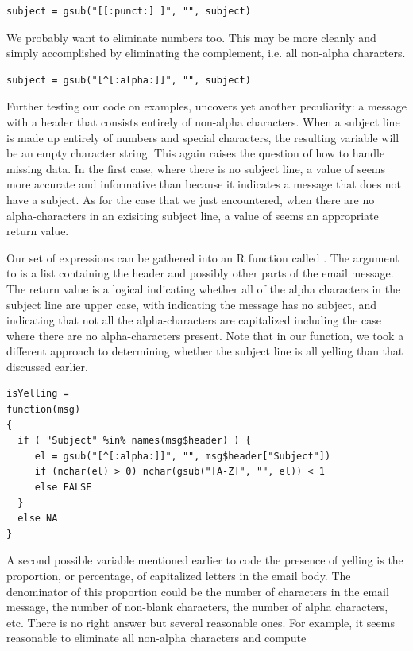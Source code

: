 \begin{verbatim}
subject = gsub("[[:punct:] ]", "", subject)
\end{verbatim}

We probably want to eliminate numbers too.
This may be more cleanly and simply accomplished by 
eliminating the complement, i.e. all non-alpha characters.

\begin{verbatim}
subject = gsub("[^[:alpha:]]", "", subject)
\end{verbatim}

Further testing our code on examples, uncovers yet another
peculiarity: a message with a header that consists entirely
of non-alpha characters. 
When a subject line is made up entirely of numbers and special
characters, the resulting variable 
will be an empty character string.
This again raises the question of how to handle missing data.
In the first case, where there is no subject line, 
a value of  seems more 
accurate and informative than  because 
it indicates a message that does not have a subject.
As for the case that we just encountered, when there
are no alpha-characters in an exisiting subject line, a value
of  seems an appropriate return value.

Our set of expressions can be gathered into an
R function called . 
The argument to  is a list containing the
header and possibly other parts of the email message. 
The return value is a logical indicating whether 
all of the alpha characters in the subject line are upper case,
with  indicating the message has no
subject, and  indicating that not all
the alpha-characters are capitalized including the 
case where there are no alpha-characters present.
Note that in our function, we took a different approach 
to determining whether the subject line is all yelling
than that discussed earlier.

\begin{verbatim}
isYelling =
function(msg)
{
  if ( "Subject" %in% names(msg$header) ) {
     el = gsub("[^[:alpha:]]", "", msg$header["Subject"])
     if (nchar(el) > 0) nchar(gsub("[A-Z]", "", el)) < 1
     else FALSE
  }
  else NA
}
\end{verbatim}

A second possible variable mentioned earlier to code the presence of 
yelling is the proportion, or percentage, of capitalized letters 
in the email body. The denominator of this proportion could be the number 
of characters in the email message, the number of non-blank characters,
the number of alpha characters, etc.  There is no right
answer but several reasonable ones. For example, it seems reasonable
to eliminate all non-alpha characters and compute 

